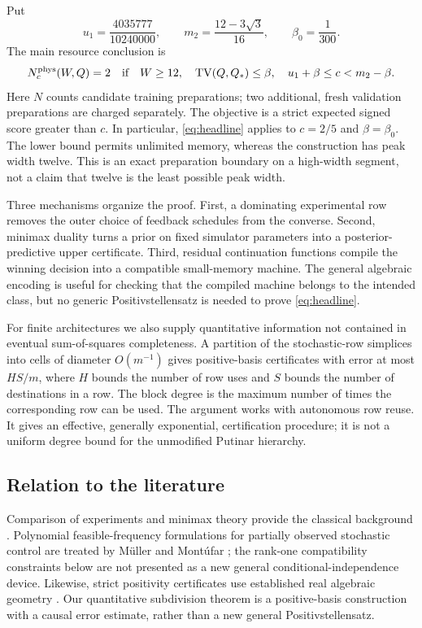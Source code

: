 \documentclass[11pt]{amsart}
\theoremstyle{definition}\newtheorem{definition}[theorem]{Definition}
\theoremstyle{remark}\newtheorem{remark}[theorem]{Remark}
\newcommand{\TV}{\operatorname{TV}}
\newcommand{\1}{\mathbf 1}
\newcommand{\Qstar}{Q_*}
\begin{document}
Put
\begin{equation}\label{eq:constants}
 u_1=\frac{4035777}{10240000},\qquad
 m_2=\frac{12-3\sqrt3}{16},\qquad \beta_0=\frac1{300}.
\end{equation}
The main resource conclusion is
\begin{equation}\label{eq:headline}
 N_c^{\rm phys}(W,Q)=2\quad\text{if}\quad
 W\ge12,\quad \TV(Q,\Qstar)\le\beta,\quad
 u_1+\beta\le c<m_2-\beta.
\end{equation}
Here $N$ counts candidate training preparations; two additional, fresh
validation preparations are charged separately. The objective is a strict
expected signed score greater than $c$. In particular, \eqref{eq:headline}
applies to $c=2/5$ and $\beta=\beta_0$. The lower bound permits unlimited
memory, whereas the construction has peak width twelve. This is an exact
preparation boundary on a high-width segment, not a claim that twelve is
the least possible peak width.

Three mechanisms organize the proof. First, a dominating experimental row
removes the outer choice of feedback schedules from the converse. Second,
minimax duality turns a prior on fixed simulator parameters into a
posterior-predictive upper certificate. Third, residual continuation
functions compile the winning decision into a compatible small-memory
machine. The general algebraic encoding is useful for checking that the
compiled machine belongs to the intended class, but no generic
Positivstellensatz is needed to prove \eqref{eq:headline}.

For finite architectures we also supply quantitative information not
contained in eventual sum-of-squares completeness. A partition of the
stochastic-row simplices into cells of diameter $O(m^{-1})$ gives
positive-basis certificates with error at most $HS/m$, where $H$ bounds
the number of row uses and $S$ bounds the number of destinations in a
row. The block degree is the maximum number of times the corresponding
row can be used. The argument works with autonomous row reuse. It gives
an effective, generally exponential, certification procedure; it is not a
uniform degree bound for the unmodified Putinar hierarchy.

\subsection{Relation to the literature}
Comparison of experiments and minimax theory provide the classical
background \cite{Blackwell,Sion}. Polynomial feasible-frequency
formulations for partially observed stochastic control are treated by
M\"uller and Mont\'ufar \cite{MM}; the rank-one compatibility constraints
below are not presented as a new general conditional-independence device.
Likewise, strict positivity certificates use established real algebraic
geometry \cite{Putinar}. Our quantitative subdivision theorem is a
positive-basis construction with a causal error estimate, rather than a
new general Positivstellensatz.
\end{document}

